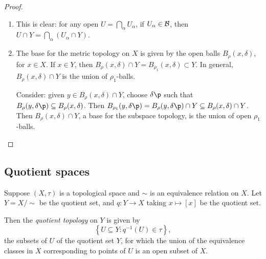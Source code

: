 \begin{proof}
\mbox{}
\begin{enumerate}
	\item This is clear: for any open $U=\bigcap_\alpha U_\alpha$, if $U_\alpha\in\cal{B}$, then $U\cap Y = \bigcap_\alpha (U_\alpha \cap Y)$.
	\item The base for the metric topology on $X$ is given by the open balls $B_\rho(x,\delta)$, for $x\in X$. If $x\in Y$, then $B_\rho(x,\delta) \cap Y = B_{\rho_1}(x,\delta) \subset Y$. In general, $B_\rho(x,\delta) \cap Y$ is the union of $\rho_1$-balls.

	Consider: given $y\in B_\rho(x,\delta) \cap Y$, choose $\delta\p$ such that $B_\rho(y,\delta\p) \subseteq B_\rho(x,\delta)$. Then $B_{\rho_1}(y,\delta\p) = B_\rho(y,\delta\p) \cap Y \subseteq B_\rho(x,\delta) \cap Y$. Then $B_\rho(x,\delta) \cap Y$, a base for the subspace topology, is the union of open $\rho_1$-balls.
	\qedhere
\end{enumerate}
\end{proof}



	\pagebreak

\subsection{Quotient spaces} %
\label{sub:quotient_spaces}

\begin{definition}
	Suppose $(X,\tau)$ is a topological space and $\sim$ is an equivalence relation on $X$. Let $Y=X/\sim$ be the quotient set, and $q:Y\to X$ taking $x\mapsto[x]$ be the quotient set.

	Then the \emph{quotient topology} on $Y$ is given by
	\begin{equation*}
		\left\{U \subseteq Y: q^{-1}(U) \in \tau\right\},
	\end{equation*}
	the subsets of $U$ of the quotient set $Y$, for which the union of the equivalence classes in $X$ corresponding to points of $U$ is an open subset of $X$.
\end{definition}

